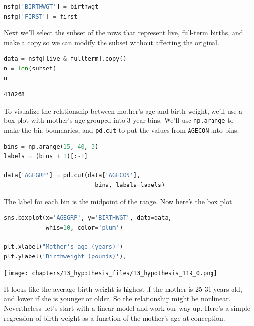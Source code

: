 \begin{lstlisting}[language=Python,style=source]
nsfg['BIRTHWGT'] = birthwgt
nsfg['FIRST'] = first
\end{lstlisting}

Next we'll select the subset of the rows that represent live, full-term
births, and make a copy so we can modify the subset without affecting
the original.

\begin{lstlisting}[language=Python,style=source]
data = nsfg[live & fullterm].copy()
n = len(subset)
n
\end{lstlisting}

\begin{lstlisting}[style=output]
418268
\end{lstlisting}

To visualize the relationship between mother's age and birth weight,
we'll use a box plot with mother's age grouped into 3-year bins. We'll
use \passthrough{\lstinline!np.arange!} to make the bin boundaries, and
\passthrough{\lstinline!pd.cut!} to put the values from
\passthrough{\lstinline!AGECON!} into bins.

\begin{lstlisting}[language=Python,style=source]
bins = np.arange(15, 40, 3)
labels = (bins + 1)[:-1]

data['AGEGRP'] = pd.cut(data['AGECON'], 
                          bins, labels=labels)
\end{lstlisting}

The label for each bin is the midpoint of the range. Now here's the box
plot.

\begin{lstlisting}[language=Python,style=source]
sns.boxplot(x='AGEGRP', y='BIRTHWGT', data=data, 
            whis=10, color='plum')

plt.xlabel("Mother's age (years)")
plt.ylabel('Birthweight (pounds)');
\end{lstlisting}

\begin{center}
\texttt{[image: chapters/13\_hypothesis\_files/13\_hypothesis\_119\_0.png]}
\end{center}

It looks like the average birth weight is highest if the mother is 25-31
years old, and lower if she is younger or older. So the relationship
might be nonlinear. Nevertheless, let's start with a linear model and
work our way up. Here's a simple regression of birth weight as a
function of the mother's age at conception.

